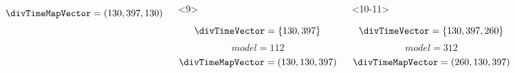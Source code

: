 \begin{frame}
\begin{columns}[t]
\begin{onlyenv}
\begin{minipage}[c][0.5\textheight][c]{\linewidth}
\begin{displaybox}[0.95\linewidth]
\begin{minipage}[c][0.45\textheight][c]{0.95\linewidth}
\[                        \]\vspace{0mm}
                        \[
                            \divTimeMapVector = (130,397,130)
                        \]\vspace{0mm}
                    \end{minipage}
                \end{displaybox}
            \end{minipage}
        \end{onlyenv}
        \begin{onlyenv}<9>
            \begin{minipage}[c][0.5\textheight][c]{\linewidth}
                \begin{displaybox}[0.95\linewidth]
                    \begin{minipage}[c][0.45\textheight][c]{0.95\linewidth}
                        \[
                            \divTimeVector = \{130,397\}
                        \]\vspace{0mm}
                        \[
                            model = 112
                        \]\vspace{0mm}
                        \[
                            \divTimeMapVector = (130,130,397)
                        \]\vspace{0mm}
                    \end{minipage}
                \end{displaybox}
            \end{minipage}
        \end{onlyenv}
        \begin{onlyenv}<10-11>
            \begin{minipage}[c][0.5\textheight][c]{\linewidth}
                \begin{displaybox}[0.95\linewidth]
                    \begin{minipage}[c][0.45\textheight][c]{0.95\linewidth}
                        \[
                            \divTimeVector = \{130,397,260\}
                        \]\vspace{0mm}
                        \[
                            model = 312
                        \]\vspace{0mm}
                        \[
                            \divTimeMapVector = (260,130,397)
                        \]\vspace{0mm}
                    \end{minipage}
                \end{displaybox}

\end{minipage}
\end{onlyenv}
\end{columns}
\end{frame}
